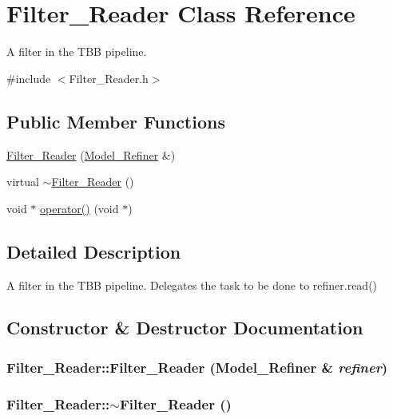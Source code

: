 \hypertarget{class_filter___reader}{
\section{Filter\_\-Reader Class Reference}
\label{class_filter___reader}
}


A filter in the TBB pipeline.  




{\ttfamily \#include $<$Filter\_\-Reader.h$>$}

\subsection*{Public Member Functions}
\begin{DoxyCompactItemize}
\item 
\hyperlink{class_filter___reader_acd08fb131a5fa64b14951dc1ac0efa40}{Filter\_\-Reader} (\hyperlink{class_model___refiner}{Model\_\-Refiner} \&)
\item 
virtual \hyperlink{class_filter___reader_a3f13004033599cae89d9f18d89fd7ad2}{$\sim$Filter\_\-Reader} ()
\item 
void $\ast$ \hyperlink{class_filter___reader_ac3730d03c07cc3871e044428ab7a1bae}{operator()} (void $\ast$)
\end{DoxyCompactItemize}


\subsection{Detailed Description}
A filter in the TBB pipeline. Delegates the task to be done to refiner.read() 

\subsection{Constructor \& Destructor Documentation}
\hypertarget{class_filter___reader_acd08fb131a5fa64b14951dc1ac0efa40}{
\subsubsection[{Filter\_\-Reader}]{\setlength{\rightskip}{0pt plus 5cm}Filter\_\-Reader::Filter\_\-Reader ({\bf Model\_\-Refiner} \& {\em refiner})}}
\label{class_filter___reader_acd08fb131a5fa64b14951dc1ac0efa40}
\hypertarget{class_filter___reader_a3f13004033599cae89d9f18d89fd7ad2}{
\subsubsection[{$\sim$Filter\_\-Reader}]{\setlength{\rightskip}{0pt plus 5cm}Filter\_\-Reader::$\sim$Filter\_\-Reader ()}}
\label{class_filter___reader_a3f13004033599cae89d9f18d89fd7ad2}


